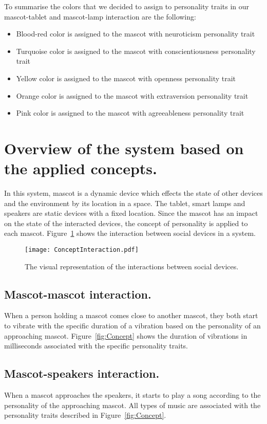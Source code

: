 To summarise the colors that we decided to assign to personality traits in our
mascot-tablet and mascot-lamp interaction are the following:
\begin{itemize}
\item Blood-red color is assigned to the mascot with neuroticism personality trait
\item Turquoise color is assigned to the mascot with conscientiousness personality trait
\item Yellow color is assigned to the mascot with openness personality trait
\item Orange color is assigned to the mascot with extraversion personality trait
\item Pink color is assigned to the mascot with agreeableness personality trait
\end{itemize}

\section{Overview of the system based on the applied concepts.}
\label{sec:overview-of-the-system-based-on-the-applied-concepts.}
In this system, mascot is a dynamic device which effects the state of other
devices and the environment by its location in a space.
The tablet, smart lamps and speakers are static devices with a fixed location.
Since the mascot has an impact on the state of the interacted devices,
the concept of personality is applied to each mascot.
Figure~\ref{fig:ConceptInteraction} shows the interaction between social devices in a system.
\begin{figure}[hbt!]
    \centering
    \texttt{[image: ConceptInteraction.pdf]}
    \caption{The visual representation of the interactions between social devices.}
    \label{fig:ConceptInteraction}
\end{figure}

\subsection*{Mascot-mascot interaction.}
When a person holding a mascot comes close to another mascot, they both start to vibrate with
the specific duration of a vibration based on the personality of an approaching mascot.
Figure~\ref{fig:Concept} shows the duration of vibrations in milliseconds associated with
the specific personality traits.

\subsection*{Mascot-speakers interaction.}
When a mascot approaches the speakers, it starts to play a song according to the personality of the approaching mascot.
All types of music are associated with the personality traits described in Figure~\ref{fig:Concept}.

